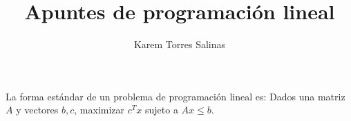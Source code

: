 \documentclass{article}
\title{Apuntes de programación lineal}
\author{Karem Torres Salinas}
\begin{document}
\maketitle

La forma estándar de un problema de programación lineal es: Dados una
matriz $A$ y vectores $b,c$, maximizar $c^Tx$ sujeto a $Ax\leq b$.
\end{document}
